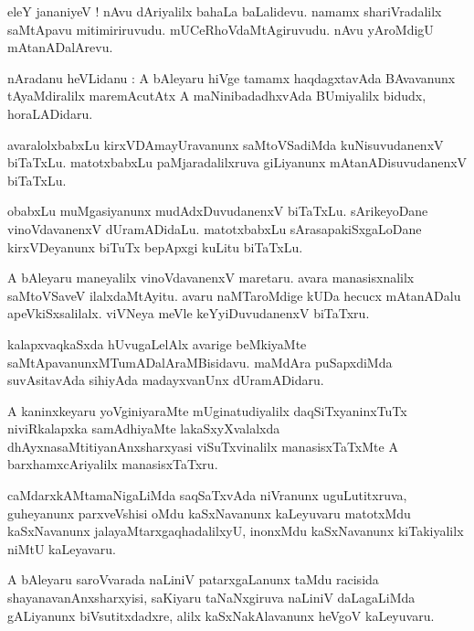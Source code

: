 \documentclass{article}
\begin{document}
\begin{mn}
eleY jananiyeV ! nAvu dAriyalilx bahaLa baLalidevu. namamx shariVradalilx saMtApavu mitimiriruvudu.
mUCeRhoVdaMtAgiruvudu. nAvu yAroMdigU mAtanADalArevu.
\end{mn}

\begin{mn}
nAradanu heVLidanu : A bAleyaru hiVge tamamx haqdagxtavAda BAvavanunx tAyaMdiralilx maremAcutAtx A 
maNinibadadhxvAda BUmiyalilx bidudx, horaLADidaru.
\end{mn}

\begin{mn}
avaralolxbabxLu kirxVDAmayUravanunx saMtoVSadiMda kuNisuvudanenxV biTaTxLu. matotxbabxLu 
paMjaradalilxruva giLiyanunx mAtanADisuvudanenxV biTaTxLu.
\end{mn}

\begin{mn}
obabxLu muMgasiyanunx mudAdxDuvudanenxV biTaTxLu. sArikeyoDane vinoVdavanenxV dUramADidaLu.
matotxbabxLu sArasapakiSxgaLoDane kirxVDeyanunx biTuTx bepApxgi kuLitu biTaTxLu.
\end{mn}

\begin{mn}
A bAleyaru maneyalilx vinoVdavanenxV maretaru. avara manasisxnalilx saMtoVSaveV ilalxdaMtAyitu. 
avaru naMTaroMdige kUDa hecucx mAtanADalu apeVkiSxsalilalx. viVNeya meVle keYyiDuvudanenxV biTaTxru.
\end{mn}

\begin{mn}
kalapxvaqkaSxda hUvugaLelAlx avarige beMkiyaMte saMtApavanunxMTumADalAraMBisidavu. maMdAra 
puSapxdiMda suvAsitavAda sihiyAda madayxvanUnx dUramADidaru.
\end{mn}

\begin{mn}
A kaninxkeyaru yoVginiyaraMte mUginatudiyalilx  daqSiTxyaninxTuTx niviRkalapxka samAdhiyaMte 
lakaSxyXvalalxda dhAyxnasaMtitiyanAnxsharxyasi viSuTxvinalilx manasisxTaTxMte A barxhamxcAriyalilx 
manasisxTaTxru.
\end{mn}

\begin{mn}
caMdarxkAMtamaNigaLiMda saqSaTxvAda niVranunx uguLutitxruva, guheyanunx parxveVshisi oMdu 
kaSxNavanunx kaLeyuvaru matotxMdu kaSxNavanunx jalayaMtarxgaqhadalilxyU, inonxMdu kaSxNavanunx 
kiTakiyalilx niMtU kaLeyavaru.
\end{mn}

\begin{mn}
A bAleyaru saroVvarada naLiniV patarxgaLanunx taMdu racisida shayanavanAnxsharxyisi, saKiyaru 
taNaNxgiruva naLiniV daLagaLiMda gALiyanunx biVsutitxdadxre, alilx kaSxNakAlavanunx heVgoV 
kaLeyuvaru.
\end{mn}
\end{document}
